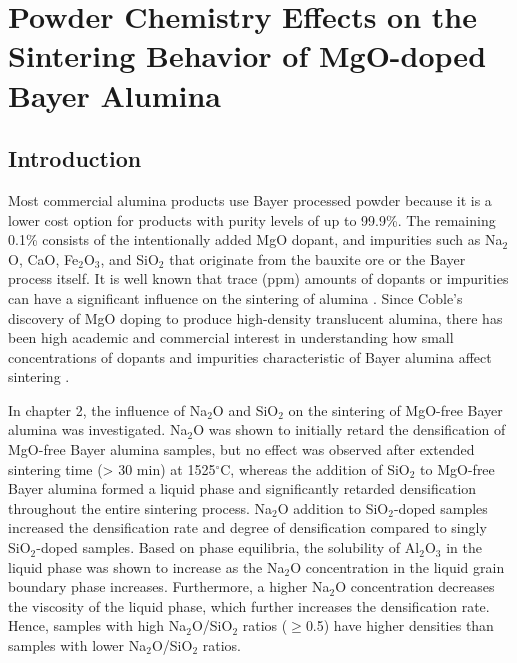 \chapter{Powder Chemistry Effects on the Sintering Behavior of MgO-doped Bayer Alumina}

\section{Introduction}
Most commercial alumina products use Bayer processed powder because it is a lower cost option for products with purity levels of up to 99.9\%. The remaining 0.1\% consists of the intentionally added MgO dopant, and impurities such as Na$_{2}$O, CaO, Fe$_{2}$O$_{3}$, and SiO$_{2}$ that originate from the bauxite ore or the Bayer process itself. It is well known that trace (ppm) amounts of dopants or impurities can have a significant influence on the sintering of alumina \cite{Bae1994,Bae1997,Bae1993}. Since Coble's discovery of MgO doping to produce high-density translucent alumina, there has been high academic and commercial interest in understanding how small concentrations of dopants and impurities characteristic of Bayer alumina affect sintering \cite{Bennison1990,Jorgensen1965,Heuer1979,Louet2005a,Park2000a}.

In chapter 2, the influence of Na$_{2}$O and SiO$_{2}$ on the sintering of MgO-free Bayer alumina was investigated. Na$_{2}$O was shown to initially retard the densification of MgO-free Bayer alumina samples, but no effect was observed after extended sintering time (> 30 min) at 1525$^{\circ}$C, whereas the addition of SiO$_{2}$ to MgO-free Bayer alumina formed a liquid phase and significantly retarded densification throughout the entire sintering process. Na$_{2}$O addition to SiO$_{2}$-doped samples increased the densification rate and degree of densification compared to singly SiO$_{2}$-doped samples. Based on phase equilibria, the solubility of Al$_{2}$O$_{3}$ in the liquid phase was shown to increase as the Na$_{2}$O concentration in the liquid grain boundary phase increases. Furthermore, a higher Na$_{2}$O concentration decreases the viscosity of the liquid phase, which further increases the densification rate. Hence, samples with high Na$_{2}$O/SiO$_{2}$ ratios ($\geq$0.5) have higher densities than samples with lower Na$_{2}$O/SiO$_{2}$ ratios. 

